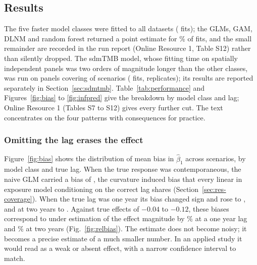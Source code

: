 \subsection{Results}\label{sec:results}

The five faster model classes were fitted to all \nDatasets{} datasets (\nFitsMain{} fits); the GLMs, GAM, DLNM and random forest returned a point estimate for \glmPctEstimate{}\% of fits, and the small remainder are recorded in the run report (Online Resource 1, Table S12) rather than silently dropped. The sdmTMB model, whose fitting time on spatially independent panels was two orders of magnitude longer than the other classes, was run on \sdmtmbPanelsN{} panels covering \sdmtmbScenarioFrac{} of scenarios (\sdmtmbFits{} fits, \sdmtmbReplicates{} replicates); its results are reported separately in Section~\ref{sec:sdmtmb}. Table~\ref{tab:performance} and Figures~\ref{fig:bias} to \ref{fig:infpred} give the breakdown by model class and lag; Online Resource 1 (Tables S7 to S12) gives every further cut. The text concentrates on the four patterns with consequences for practice.

\performanceTable

\subsubsection{Omitting the lag erases the effect}\label{sec:res-lag}

Figure~\ref{fig:bias} shows the distribution of mean bias in $\hat\beta_1$ across scenarios, by model class and true lag. When the true response was contemporaneous, the naive GLM carried a bias of \naiveBiasLagZero{}, the curvature induced bias that every linear in exposure model conditioning on the correct lag shares (Section~\ref{sec:res-coverage}). When the true lag was one year its bias changed sign and rose to \naiveBiasLagOne{}, and at two years to \naiveBiasLagTwo{}. Against true effects of $-0.04$ to $-0.12$, these biases correspond to under estimation of the effect magnitude by \naiveRelBiasLagOne{}\% at a one year lag and \naiveRelBiasLagTwo{}\% at two years (Fig.~\ref{fig:relbias}). The estimate does not become noisy; it becomes a precise estimate of a much smaller number. In an applied study it would read as a weak or absent effect, with a narrow confidence interval to match.


